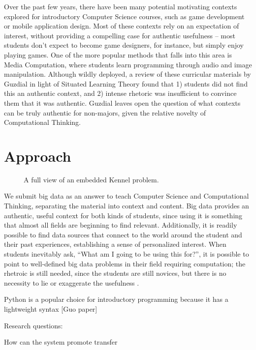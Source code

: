 \documentclass{sig-alternate}
\begin{document}
Over the past few years, there have been many potential motivating contexts explored for introductory Computer Science courses, such as game development or mobile application design. 
Most of these contexts rely on an expectation of interest, without providing a compelling case for authentic usefulness -- most students don't expect to become game designers, for instance, but simply enjoy playing games.
One of the more popular methods that falls into this area is Media Computation, where students learn programming through audio and image manipulation. 
Although wildly deployed, a review of these curricular materials by Guzdial \cite{guzdial2006imagineering} in light of Situated Learning Theory found that 1) students did not find this an authentic context, and 2) intense rhetoric was insufficient to convince them that it was authentic. 
Guzdial leaves open the question of what contexts can be truly authentic for non-majors, given the relative novelty of Computational Thinking.

\section{Approach}

\begin{figure*}
\label{fig-full-kennel}
\caption{A full view of an embedded Kennel problem.}
\end{figure*}

We submit big data as an answer to teach Computer Science and Computational Thinking, separating the material into context and content.
Big data provides an authentic, useful context for both kinds of students, since using it is something that almost all fields are beginning to find relevant.
Additionally, it is readily possible to find data sources that connect to the world around the student and their past experiences, establishing a sense of personalized interest.
When students inevitably ask, ``What am I going to be using this for?'', it is possible to point to well-defined  big data problems in their field requiring computation; the rhetroic is still needed, since the students are still novices, but there is no necessity to lie or exaggerate the usefulness \cite{guzdial2006imagineering}.


Python is a popular choice for introductory programming because it  has a lightweight syntax [Guo paper]


Research questions:

How can the system promote transfer
\end{document}
